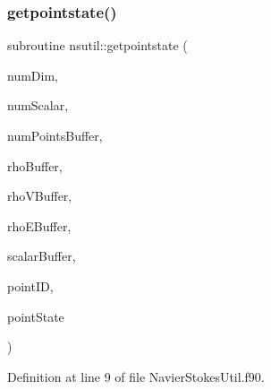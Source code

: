 \subsubsection{\texorpdfstring{getpointstate()}{getpointstate()}}
{\footnotesize\ttfamily subroutine nsutil\+::getpointstate (\begin{DoxyParamCaption}\item[{integer(kind=4), intent(in)}]{num\+Dim,  }\item[{integer(kind=4), intent(in)}]{num\+Scalar,  }\item[{integer(kind=8), intent(in)}]{num\+Points\+Buffer,  }\item[{real(kind=8), dimension(numpointsbuffer), intent(in)}]{rho\+Buffer,  }\item[{real(kind=8), dimension(numdim$\ast$numpointsbuffer), intent(in)}]{rho\+V\+Buffer,  }\item[{real(kind=8), dimension(numpointsbuffer), intent(in)}]{rho\+E\+Buffer,  }\item[{real(kind=8), dimension(numscalar$\ast$numpointsbuffer), intent(in)}]{scalar\+Buffer,  }\item[{integer(kind=8), intent(in)}]{point\+ID,  }\item[{real(kind=8), dimension(numdim+2+numscalar), intent(out)}]{point\+State }\end{DoxyParamCaption})}



Definition at line 9 of file Navier\+Stokes\+Util.\+f90.

